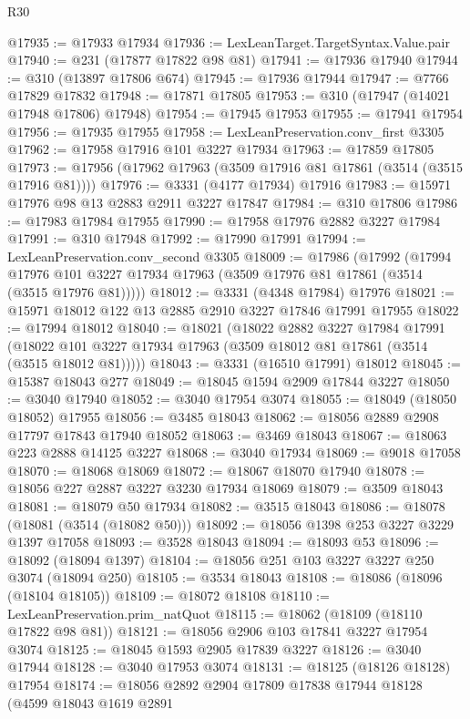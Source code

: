 \begin{lexlean}{R30}
\begin{coremodule}
@17935 := @17933 @17934
@17936 := LexLeanTarget.TargetSyntax.Value.pair
@17940 := @231 (@17877 @17822 @98 @81)
@17941 := @17936 @17940
@17944 := @310 (@13897 @17806 @674)
@17945 := @17936 @17944
@17947 := @7766 @17829 @17832
@17948 := @17871 @17805
@17953 := @310 (@17947 (@14021 @17948 @17806) @17948)
@17954 := @17945 @17953
@17955 := @17941 @17954
@17956 := @17935 @17955
@17958 := LexLeanPreservation.conv_first @3305
@17962 := @17958 @17916 @101 @3227 @17934
@17963 := @17859 @17805
@17973 := @17956 (@17962 @17963 (@3509 @17916 @81 @17861 (@3514 (@3515 @17916 @81))))
@17976 := @3331 (@4177 @17934) @17916
@17983 := @15971 @17976 @98 @13 @2883 @2911 @3227 @17847
@17984 := @310 @17806
@17986 := @17983 @17984 @17955
@17990 := @17958 @17976 @2882 @3227 @17984
@17991 := @310 @17948
@17992 := @17990 @17991
@17994 := LexLeanPreservation.conv_second @3305
@18009 := @17986
    (@17992
      (@17994 @17976 @101 @3227 @17934 @17963 (@3509 @17976 @81 @17861 (@3514 (@3515 @17976 @81)))))
@18012 := @3331 (@4348 @17984) @17976
@18021 := @15971 @18012 @122 @13 @2885 @2910 @3227 @17846 @17991 @17955
@18022 := @17994 @18012
@18040 := @18021
    (@18022
      @2882
      @3227
      @17984
      @17991
      (@18022 @101 @3227 @17934 @17963 (@3509 @18012 @81 @17861 (@3514 (@3515 @18012 @81)))))
@18043 := @3331 (@16510 @17991) @18012
@18045 := @15387 @18043 @277
@18049 := @18045 @1594 @2909 @17844 @3227
@18050 := @3040 @17940
@18052 := @3040 @17954 @3074
@18055 := @18049 (@18050 @18052) @17955
@18056 := @3485 @18043
@18062 := @18056 @2889 @2908 @17797 @17843 @17940 @18052
@18063 := @3469 @18043
@18067 := @18063 @223 @2888 @14125 @3227
@18068 := @3040 @17934
@18069 := @9018 @17058
@18070 := @18068 @18069
@18072 := @18067 @18070 @17940
@18078 := @18056 @227 @2887 @3227 @3230 @17934 @18069
@18079 := @3509 @18043
@18081 := @18079 @50 @17934
@18082 := @3515 @18043
@18086 := @18078 (@18081 (@3514 (@18082 @50)))
@18092 := @18056 @1398 @253 @3227 @3229 @1397 @17058
@18093 := @3528 @18043
@18094 := @18093 @53
@18096 := @18092 (@18094 @1397)
@18104 := @18056 @251 @103 @3227 @3227 @250 @3074 (@18094 @250)
@18105 := @3534 @18043
@18108 := @18086 (@18096 (@18104 @18105))
@18109 := @18072 @18108
@18110 := LexLeanPreservation.prim_natQuot
@18115 := @18062 (@18109 (@18110 @17822 @98 @81))
@18121 := @18056 @2906 @103 @17841 @3227 @17954 @3074
@18125 := @18045 @1593 @2905 @17839 @3227
@18126 := @3040 @17944
@18128 := @3040 @17953 @3074
@18131 := @18125 (@18126 @18128) @17954
@18174 := @18056
    @2892
    @2904
    @17809
    @17838
    @17944
    @18128
    (@4599
      @18043
      @1619
      @2891

\end{coremodule}
\end{lexlean}
